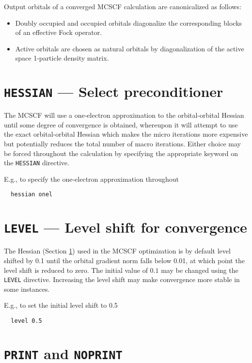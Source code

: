 Output orbitals of a converged MCSCF calculation are canonicalized as
follows:
\begin{itemize}
\item Doubly occupied and occupied orbitals diagonalize the
  corresponding blocks of an effective Fock operator.
\item Active orbitals are chosen as natural orbitals by
  diagonalization of the active space 1-particle density matrix.
\end{itemize}

\section{{\tt HESSIAN} --- Select preconditioner}
\label{sec:mcscfhessian}

The MCSCF will use a one-electron approximation to the orbital-orbital
Hessian until some degree of convergence is obtained, whereupon it
will attempt to use the exact orbital-orbital Hessian which makes the
micro iterations more expensive but potentially reduces the total
number of macro iterations.  Either choice may be forced throughout
the calculation by specifying the appropriate keyword on the
\verb+HESSIAN+ directive.

E.g., to specify the one-electron approximation throughout
\begin{verbatim}
  hessian onel
\end{verbatim}

\section{{\tt LEVEL} --- Level shift for convergence}

The Hessian (Section \ref{sec:mcscfhessian}) used in the MCSCF
optimization is by default level shifted by 0.1 until the orbital
gradient norm falls below 0.01, at which point the level shift is
reduced to zero.  The initial value of $0.1$ may be changed using
the \verb+LEVEL+ directive.  Increasing the level shift may make
convergence more stable in some instances.

E.g., to set the initial level shift to 0.5
\begin{verbatim}
  level 0.5
\end{verbatim}

\section{{\tt PRINT} and {\tt NOPRINT}}

